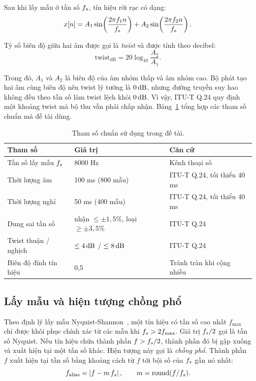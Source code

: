\documentclass{dtmf_report}
\begin{document}
Sau khi lấy mẫu ở tần số $f_{s}$, tín hiệu rời rạc có dạng:
\begin{equation}\label{eq:dtmf-roi-rac}
  x[n] = A_{1}\sin\!\left(\frac{2\pi f_{1} n}{f_{s}}\right)
       + A_{2}\sin\!\left(\frac{2\pi f_{2} n}{f_{s}}\right).
\end{equation}

Tỷ số biên độ giữa hai âm được gọi là \emph{twist} và được tính theo decibel:
\begin{equation}\label{eq:twist}
  \mathrm{twist}_{\mathrm{dB}} = 20\log_{10}\frac{A_{2}}{A_{1}}.
\end{equation}

Trong đó, $A_{1}$ và $A_{2}$ là biên độ của âm nhóm thấp và âm nhóm cao. Bộ phát
tạo hai âm cùng biên độ nên twist lý tưởng là $0\,\mathrm{dB}$, nhưng đường truyền suy hao
không đều theo tần số làm twist lệch khỏi $0\,\mathrm{dB}$. Vì vậy, \mbox{ITU-T} Q.24 quy
định một khoảng twist mà bộ thu vẫn phải chấp nhận.
Bảng~\ref{tab:tham-so} tổng hợp các tham số chuẩn mà đề tài dùng.

\begin{table}[H]
\centering
\caption{Tham số chuẩn sử dụng trong đề tài.}
\label{tab:tham-so}
\small
\setlength{\tabcolsep}{6pt}
\begin{tabular}{@{}l l l@{}}
\toprule
\textbf{Tham số} & \textbf{Giá trị} & \textbf{Căn cứ} \\
\midrule
Tần số lấy mẫu $f_{s}$           & 8000 Hz          & Kênh thoại số \\
Thời lượng âm                  & 100 ms (800 mẫu) & \mbox{ITU-T} Q.24, tối thiểu 40 ms \\
Thời lượng nghỉ                & 50 ms (400 mẫu)  & \mbox{ITU-T} Q.24, tối thiểu 40 ms \\
Dung sai tần số                & nhận $\le \pm 1{,}5\%$, loại $\ge \pm 3{,}5\%$ & \mbox{ITU-T} Q.24 \\
Twist thuận / nghịch           & $\le 4\,\mathrm{dB}$ / $\le 8\,\mathrm{dB}$ & \mbox{ITU-T} Q.24 \\
Biên độ đỉnh tín hiệu          & 0,5              & Tránh tràn khi cộng nhiễu \\
\bottomrule
\end{tabular}
\end{table}

\subsection{Lấy mẫu và hiện tượng chồng phổ}

Theo định lý lấy mẫu Nyquist-Shannon~\cite{xltinhieu_tap1}, một
tín hiệu có tần số cao nhất $f_{\max}$ chỉ được khôi phục chính xác từ các mẫu
khi $f_{s} > 2 f_{\max}$. Giá trị $f_{s}/2$ gọi là tần số Nyquist. Nếu tín hiệu chứa
thành phần $f > f_{s}/2$, thành phần đó bị gập xuống và xuất hiện tại một tần số
khác. Hiện tượng này gọi là \emph{chồng phổ}. Thành phần $f$ xuất hiện tại tần số
bằng khoảng cách từ $f$ tới bội số của $f_{s}$ gần nó nhất:
\begin{equation}\label{eq:aliasing}
  f_{\mathrm{alias}} = \left| f - m\,f_{s} \right|,
  \qquad m = \operatorname{round}(f/f_{s}).
\end{equation}
\end{document}
